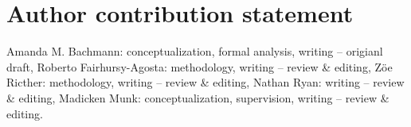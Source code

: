 \section*{Author contribution statement}
Amanda M. Bachmann: conceptualization, formal analysis, writing -- origianl draft, 
Roberto Fairhursy-Agosta: methodology, writing -- review \& editing, 
Z\"{o}e Ricther: methodology, writing -- review \& editing, 
Nathan Ryan: writing -- review \& editing, 
Madicken Munk: conceptualization, supervision, writing -- review \& editing. 